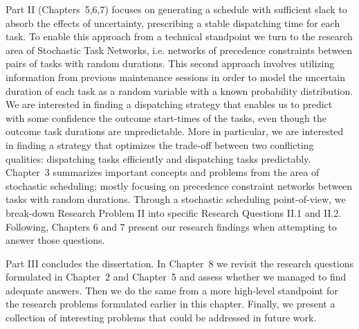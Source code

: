 		Part II (Chapters~5,6,7) focuses on generating a schedule with sufficient slack to absorb the effects of uncertainty,
		prescribing a stable dispatching time for each task.
		To enable this approach from a technical standpoint we turn to the research area of Stochastic Task Networks,
		i.e. networks of precedence constraints between pairs of tasks with random durations.
		This second approach involves utilizing information from previous maintenance sessions 
		in order to model the uncertain duration of each task as a random variable with a known probability distribution.
		We are interested in finding a dispatching strategy that enables us to predict with some confidence the outcome start-times of the tasks, 
		even though the outcome task durations are unpredictable.
		More in particular, we are interested in finding a strategy that optimizes the trade-off between two conflicting qualities:
		dispatching tasks efficiently and dispatching tasks predictably.
		Chapter~3 summarizes important concepts and problems from the area of stochastic scheduling;
		mostly focusing on precedence constraint networks between tasks with random durations.
		Through a stochastic scheduling point-of-view,
		we break-down Research Problem II into specific Research Questions II.1 and II.2.
		Following, Chapters 6 and 7 present our research findings when attempting to answer those questions.

		Part III concludes the dissertation.
		In Chapter~8 we revisit the research questions formulated in Chapter~2 and Chapter~5 and assess whether we managed to find adequate answers.
		Then we do the same from a more high-level standpoint for the research problems formulated earlier in this chapter.
		Finally, we present a collection of interesting problems that could be addressed in future work.

